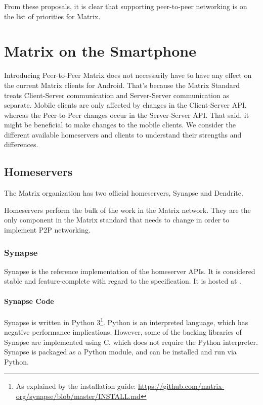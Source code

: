 From these proposals, it is clear that supporting peer-to-peer networking is on the list of priorities for Matrix.

\section{Matrix on the Smartphone}\label{sec:matrix_on_the_smartphone}
Introducing Peer-to-Peer Matrix does not necessarily have to have any effect on the current Matrix clients for Android.
That's because the Matrix Standard treats Client-Server communication and Server-Server communication as separate.
Mobile clients are only affected by changes in the Client-Server API, whereas the Peer-to-Peer changes occur in the Server-Server API\@.
That said, it might be beneficial to make changes to the mobile clients.
We consider the different available homeservers and clients to understand their strengths and differences.

\subsection{Homeservers}\label{sec:official_homeservers}
The Matrix organization has two official homeservers, Synapse\cite{matrix_org_synapse} and Dendrite\cite{matrix_org_dendrite}.

Homeservers perform the bulk of the work in the Matrix network.
They are the only component in the Matrix standard that needs to change in order to implement \ac{P2P} networking\cite{fosdem_event_p2p_matrix}.

\subsubsection{Synapse}
Synapse is the reference implementation of the homeserver \ac{API}s.
It is considered stable and feature-complete with regard to the specification.
It is hosted at .

\paragraph{Synapse Code}
Synapse is written in Python 3\footnote{As explained by the installation guide: \url{https://github.com/matrix-org/synapse/blob/master/INSTALL.md}}.
Python is an interpreted language, which has negative performance implications.
However, some of the backing libraries of Synapse are implemented using C, which does not require the Python interpreter.
Synapse is packaged as a Python module, and can be installed and run via Python.

